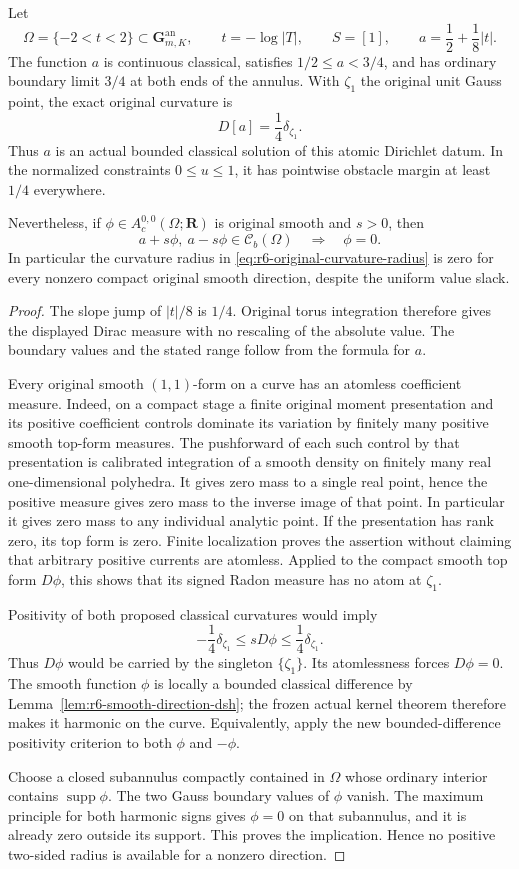 \documentclass[11pt,a4paper]{article}
\numberwithin{equation}{section}
\theoremstyle{definition}
\theoremstyle{remark}
\newcommand{\an}{\mathrm{an}}
\begin{document}
Let
\[
 \Omega=\{-2<t<2\}\subset\mathbf G_{m,K}^{\an},
       \qquad t=-\log|T|,\qquad S=[1],
       \qquad a=\frac12+\frac18|t|.
\]
The function $a$ is continuous classical, satisfies
$1/2\le a<3/4$, and has ordinary boundary limit $3/4$ at both
ends of the annulus. With $\zeta_1$ the original unit Gauss point,
the exact original curvature is
\[
                           D[a]=\frac14\delta_{\zeta_1}.
\]
Thus $a$ is an actual bounded classical solution of this atomic
Dirichlet datum. In the normalized constraints $0\le u\le1$,
it has pointwise obstacle margin at least $1/4$ everywhere.

Nevertheless, if $\phi\in A_c^{0,0}(\Omega;\mathbf R)$ is
original smooth and $s>0$, then
\[
       a+s\phi,\ a-s\phi\in\mathcal C_b(\Omega)
                         \quad\Longrightarrow\quad \phi=0.
\]
In particular the curvature radius in
\eqref{eq:r6-original-curvature-radius} is zero for every nonzero
compact original smooth direction, despite the uniform value slack.

\begin{proof}
The slope jump of $|t|/8$ is $1/4$. Original torus integration
therefore gives the displayed Dirac measure with no rescaling of
the absolute value. The boundary values and the stated range follow
from the formula for $a$.

Every original smooth $(1,1)$-form on a curve has an atomless
coefficient measure. Indeed, on a compact stage a finite original
moment presentation and its positive coefficient controls dominate
its variation by finitely many positive smooth top-form measures.
The pushforward of each such control by that presentation is
calibrated integration of a smooth density on finitely many real
one-dimensional polyhedra. It gives zero mass to a single real
point, hence the positive measure gives zero mass to the inverse
image of that point. In particular it gives zero mass to any
individual analytic point. If the presentation has rank zero, its
top form is zero. Finite localization proves the assertion without
claiming that arbitrary positive currents are atomless. Applied to
the compact smooth top form $D\phi$, this shows that its signed
Radon measure has no atom at $\zeta_1$.

Positivity of both proposed classical curvatures would imply
\[
     -\frac14\delta_{\zeta_1}\le sD\phi
                          \le\frac14\delta_{\zeta_1}.
\]
Thus $D\phi$ would be carried by the singleton $\{\zeta_1\}$.
Its atomlessness forces $D\phi=0$. The smooth function $\phi$
is locally a bounded classical difference by
Lemma~\ref{lem:r6-smooth-direction-dsh}; the frozen actual kernel
theorem therefore makes it harmonic on the curve. Equivalently,
apply the new bounded-difference positivity criterion to both
$\phi$ and $-\phi$.

Choose a closed subannulus compactly contained in $\Omega$ whose
ordinary interior contains $\operatorname{supp}\phi$.
The two Gauss boundary values of $\phi$ vanish. The maximum
principle for both harmonic signs gives $\phi=0$ on that
subannulus, and it is already zero outside its support. This proves
the implication. Hence no positive two-sided radius is available
for a nonzero direction.
\end{proof}
\end{document}
